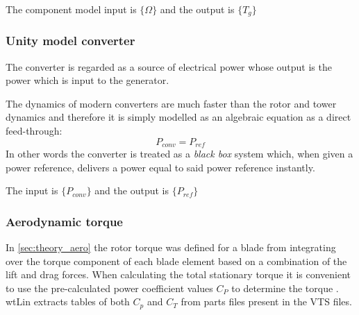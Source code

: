 The component model input is $ \{\Omega\} $ and the output is $ \{T_g\} $


\subsubsection{Unity model converter} \label{sec:wtLin_conv_unity}
The converter is regarded as a source of electrical power whose output is the power which is input to the generator.

The dynamics of modern converters are much faster than the rotor and tower dynamics and therefore it is simply modelled as an algebraic equation as a direct feed-through:
\begin{equation}\label{eq:wtLin_comp_convdft}
	P_{conv} = P_{ref}
\end{equation}
In other words the converter is treated as a \textit{black box} system which, when given a power reference, delivers a power equal to said power reference instantly.

The input is $ \{P_{conv}\} $ and the output is $ \{P_{ref}\} $


\subsubsection{Aerodynamic torque} \label{sec:wtLin_aero_torque}
In \cref{sec:theory_aero} the rotor torque was defined for a blade from integrating over the torque component of each blade element based on a combination of the lift and drag forces. When calculating the total stationary torque it is convenient to use the pre-calculated power coefficient values $ C_P $ to determine the torque \cite{Knudsen2013}. wtLin extracts tables of both $ C_p $ and $ C_T $ from parts files present in the VTS files.

